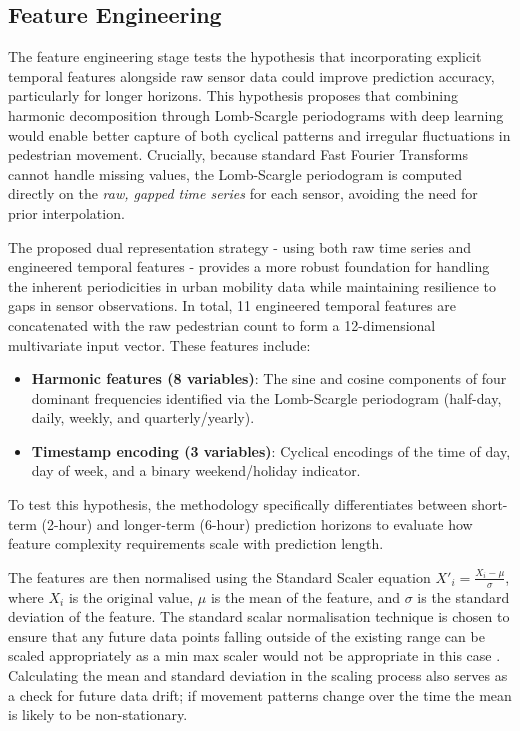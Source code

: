 \documentclass[journal,sensors,submit,pdftex,moreauthors]{Definitions/mdpi}
\begin{document}
\subsection{Feature Engineering}

The feature engineering stage tests the hypothesis that incorporating explicit temporal features alongside raw sensor data could improve prediction accuracy, particularly for longer horizons. This hypothesis proposes that combining harmonic decomposition through Lomb-Scargle periodograms \citep{pressFastAlgorithmSpectral1989, vanderplasUnderstandingLombScargle2018} with deep learning would enable better capture of both cyclical patterns and irregular fluctuations in pedestrian movement. Crucially, because standard Fast Fourier Transforms cannot handle missing values, the Lomb-Scargle periodogram is computed directly on the \emph{raw, gapped time series} for each sensor, avoiding the need for prior interpolation.

The proposed dual representation strategy - using both raw time series and engineered temporal features - provides a more robust foundation for handling the inherent periodicities in urban mobility data while maintaining resilience to gaps in sensor observations. In total, 11 engineered temporal features are concatenated with the raw pedestrian count to form a 12-dimensional multivariate input vector. These features include:
\begin{itemize}
    \item \textbf{Harmonic features (8 variables)}: The sine and cosine components of four dominant frequencies identified via the Lomb-Scargle periodogram (half-day, daily, weekly, and quarterly/yearly).
    \item \textbf{Timestamp encoding (3 variables)}: Cyclical encodings of the time of day, day of week, and a binary weekend/holiday indicator.
\end{itemize}

To test this hypothesis, the methodology specifically differentiates between short-term (2-hour) and longer-term (6-hour) prediction horizons to evaluate how feature complexity requirements scale with prediction length.

The features are then normalised using the Standard Scaler equation $X'_i = \frac{X_i-\mu}{\sigma}$, where $X_i$ is the original value, $\mu$ is the mean of the feature, and $\sigma$ is the standard deviation of the feature. The standard scalar normalisation technique is chosen to ensure that any future data points falling outside of the existing range can be scaled appropriately as a min max scaler would not be appropriate in this case \citep{hastieModelInferenceAveraging2001}. Calculating the mean and standard deviation in the scaling process also serves as a check for future data drift; if movement patterns change over the time the mean is likely to be non-stationary.
\end{document}
